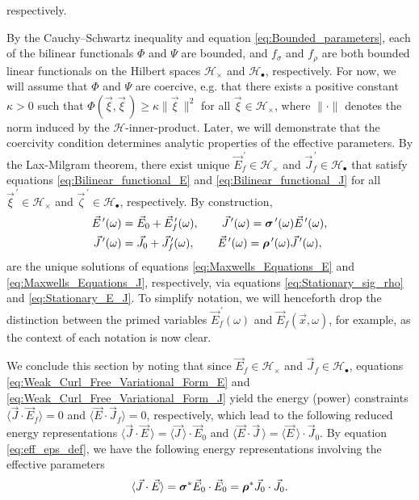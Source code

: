 \documentclass[11pt]{amsart}
\newcommand\bsig{\mbox{\boldmath${\sigma}$}}
\newcommand\brho{\mbox{\boldmath${\rho}$}}
\begin{document}
%
respectively.




By the Cauchy--Schwartz inequality and equation
\eqref{eq:Bounded_parameters}, each of the bilinear functionals $\Phi$
and $\Psi$ are bounded, and $f_\sigma$ and $f_\rho$ are both bounded linear
functionals on the Hilbert spaces $\mathscr{H}_\times$ and 
$\mathscr{H}_\bullet$, respectively. For now, we will assume that $\Phi$ and
$\Psi$ are coercive, e.g. that there exists a positive constant 
$\kappa>0$ such that $\Phi(\vec{\xi},\vec{\xi}\,)\geq\kappa\|\vec{\xi}\,\|^2$ for all 
$\vec{\xi}\in\mathscr{H}_\times$, where $\|\cdot\|$ denotes the norm induced by the
$\mathscr{H}$-inner-product. Later, we will demonstrate that the
coercivity condition determines analytic properties of the
effective parameters. By the Lax-Milgram theorem, there exist unique
$\vec{E}_f^{\,\prime}\in\mathscr{H}_\times$ and $\vec{J}_f^{\,\prime}\in\mathscr{H}_\bullet$
that satisfy equations \eqref{eq:Bilinear_functional_E} and
\eqref{eq:Bilinear_functional_J} for all $\vec{\xi}^{\,\prime}\in\mathscr{H}_\times$
and $\vec{\zeta}^{\,\prime}\in\mathscr{H}_\bullet$, respectively. By construction,
%
\begin{align}\label{eq:Unique_Solutions}
  \vec{E}^{\,\prime}(\omega)&=\vec{E}_0+\vec{E}_f^{\,\prime}(\omega), \qquad
  \vec{J}^{\,\prime}(\omega)=\bsig^{\,\prime}(\omega)\vec{E}^{\,\prime}(\omega),
  \\
  \vec{J}^{\,\prime}(\omega)&=\vec{J}_0+\vec{J}_f^{\,\prime}(\omega), \qquad
  \vec{E}^{\,\prime}(\omega)=\brho^{\,\prime}(\omega)\vec{J}^{\,\prime}(\omega),
\end{align}
%
are the unique solutions of equations \eqref{eq:Maxwells_Equations_E}
and \eqref{eq:Maxwells_Equations_J}, respectively, via equations
\eqref{eq:Stationary_sig_rho} and \eqref{eq:Stationary_E_J}. 
To simplify notation, we will henceforth drop
the distinction between the primed variables $\vec{E}_f^{\,\prime}(\omega)$ and 
$\vec{E}_f(\vec{x},\omega)$, for example, as the context of each notation
is now clear.





We conclude this section by noting that since
$\vec{E}_f\in\mathscr{H}_\times$ and $\vec{J}_f\in\mathscr{H}_\bullet$, equations
\eqref{eq:Weak_Curl_Free_Variational_Form_E} and
\eqref{eq:Weak_Curl_Free_Variational_Form_J} yield the energy (power)
\cite{Jackson-1999} constraints $\langle\vec{J}\cdot\vec{E}_f\rangle=0$ and
$\langle\vec{E}\cdot\vec{J}_f\rangle=0$, respectively, which lead to the following
reduced energy representations $\langle\vec{J}\cdot\vec{E}\,\rangle=\langle\vec{J\,}\rangle\cdot\vec{E}_0$
and $\langle\vec{E}\cdot\vec{J}\,\rangle=\langle\vec{E}\,\rangle\cdot\vec{J}_0$. By equation
\eqref{eq:eff_eps_def}, we have the following energy representations
involving the effective parameters  
%
\begin{align}\label{eq:Energy_Reps}
  \langle\vec{J}\cdot\vec{E}\rangle=\bsig^*\vec{E}_0\cdot\vec{E}_0=\brho^*\vec{J}_0\cdot\vec{J}_0.
\end{align}
%
\end{document}
